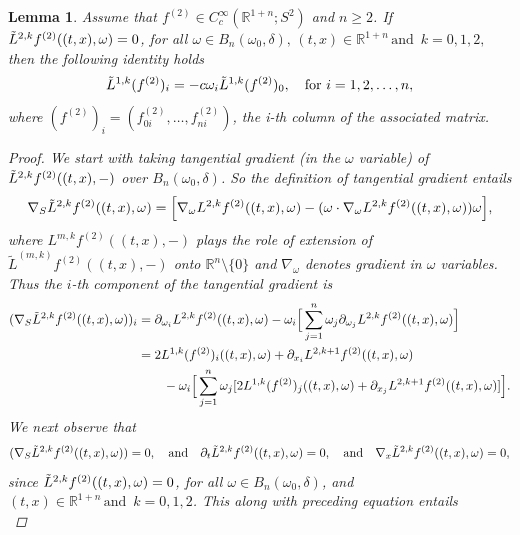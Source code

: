 \documentclass[11pt,a4paper,reqno]{amsart}
\newtheorem{lemma}[definition]{Lemma}
\newcommand{\R}{\mathbb{R}}
\newcommand{\Bdl}{B_{n}(\omega_0,\delta)}
\newcommand{\om}{\omega}
\newcommand{\PD}{\partial}
\begin{document}
	\begin{lemma}\label{lemma2.7}
		Assume that $f^{(2)}\in C^{\infty}_{c}(\mathbb{R}^{1+n};S^{2})$ and $n\geq 2$. If 
		$
		\Tilde{L}^{2,k}f^{(2)}((t,x), \omega) =0 $, for all $ \omega \in \Bdl,\, (t,x) \in \mathbb{R}^{1+n}\,\text{and }\, k = 0,1,2,
		$
		then the following identity holds
		\begin{equation}\label{relation1}
			\Tilde{L}^{1,k}(f^{(2)})_i=-c\omega_{i}\Tilde{L}^{1,k}(f^{(2)})_{0}, \quad\text{for } i=1,2,\dots,n,
		\end{equation} 
		where $(f^{(2)})_{i}=(f^{(2)}_{0i},\dots,f^{(2)}_{ni})$, the i-th column of the associated matrix.
		\begin{proof}
			We start with taking tangential gradient (in the $\om$ variable) of $\Tilde{L}^{2,k}f^{(2)}((t,x),-)$ over $ B_{n}(\omega_0,\delta)$. So the definition of tangential gradient entails
			\begin{equation}
				\nabla_{S}\Tilde{L}^{2,k}f^{(2)}((t,x),\om)=\Big[\nabla_{\omega}L^{2,k}f^{(2)}((t,x),\om)-(\omega \cdot \nabla_{\omega}L^{2,k}f^{(2)}((t,x),\om))\omega\Big ],
			\end{equation}
			where $L^{m,k}f^{(2)}((t,x),-)$ plays the role of extension of $\tilde{L}^{(m,k)}f^{(2)}((t,x),-)$ onto $\R^n\setminus\{0\}$ and  $\nabla_{\omega}$ denotes gradient in $\omega $ variables. Thus the $i$-th component of the tangential gradient is 
			\begin{equation*}
				\begin{aligned}
					(\nabla_{S}\Tilde{L}^{2,k}f^{(2)}((t,x),\om))_i &= \partial_{\omega_i}L^{2,k}f^{(2)}((t,x),\om)-\omega_{i}\Big[\sum_{j=1}^{n}\om_j\partial_{\omega_j}L^{2,k}f^{(2)}((t,x),\om)\Big]\\
					& =2L^{1,k}(f^{(2)})_i((t,x),\om) +\partial_{x_i}L^{2,k+1}f^{(2)}((t,x),\om)\\&\qquad-\omega_{i}\Big [\sum_{j=1}^{n}\omega_j [2L^{1,k}(f^{(2)})_j ((t,x),\om)+\partial_{x_j}L^{2,k+1}f^{(2)}((t,x),\om)]\Big].
				\end{aligned}
			\end{equation*}
We next observe that	
\[  (\nabla_{S}\Tilde{L}^{2,k}f^{(2)}((t,x),\om)) =0,
\quad \mbox{and} \quad 
\PD_t \Tilde{L}^{2,k}f^{(2)}((t,x),\om)=0, 
\quad \mbox{and} \quad
\nabla_x\Tilde{L}^{2,k}f^{(2)}((t,x),\om)=0,\]  since $	\Tilde{L}^{2,k}f^{(2)}((t,x), \omega) =0 $, for all $ \omega \in \Bdl$, and $(t,x) \in \mathbb{R}^{1+n}\,\text{and }\, k = 0,1,2$. This along with preceding equation entails
			\begin{equation*}

\end{equation*}
\end{proof}
\end{lemma}
\end{document}

